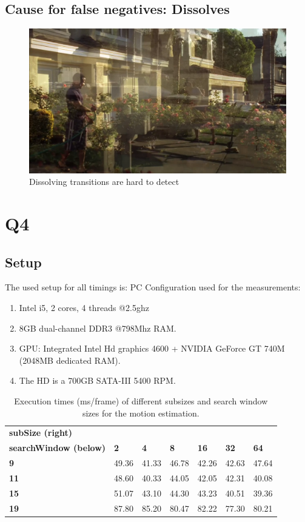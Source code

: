 \begin{appendices}
\subsection{Cause for false negatives: Dissolves}
\label{app:dissolve}
\begin{figure}[ht]
  \centering
  \includegraphics[width=.85\textwidth]{figs/dissolve}
  \caption{Dissolving transitions are hard to detect}
  \label{fig:dissolve}
\end{figure}

\newpage
\section{Q4}\label{app:q4}

\subsection{Setup}\label{q4:setup}
The used setup for all timings is: PC Configuration used for the measurements: 
\begin{enumerate}
\item Intel i5, 2 cores, 4 threads @2.5ghz 
\item 8GB dual-channel DDR3 @798Mhz RAM. 
\item GPU: Integrated Intel Hd graphics 4600 + NVIDIA GeForce GT 740M (2048MB dedicated RAM). 
\item The HD is a 700GB SATA-III 5400 RPM.
\end{enumerate}

\begin{table}[!ht]
\caption{Execution times (ms/frame) of different subsizes and search window sizes for the motion estimation.}
\label{execMotion}
\begin{tabular}{|l|l|l|l|l|l|l|}
\hline
\textbf{subSize (right)}\\ \textbf{searchWindow (below)}& \textbf{2} & \textbf{4} & \textbf{8} & \textbf{16} & \textbf{32} & \textbf{64} \\ \hline
\textbf{9}  & 49.36 & 41.33 & 46.78 & 42.26 & 42.63 & 47.64 \\ \hline
\textbf{11} & 48.60 & 40.33 & 44.05 & 42.05 & 42.31 & 40.08 \\ \hline
\textbf{15} & 51.07 & 43.10 & 44.30 & 43.23 & 40.51 & 39.36 \\ \hline
\textbf{19} & 87.80 & 85.20 & 80.47 & 82.22 & 77.30 & 80.21 \\ \hline
\end{tabular}
\end{table}


\end{appendices}
